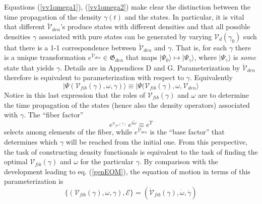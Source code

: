 \documentclass[aps,preprint]{revtex4}%
\begin{document}
Equations (\ref{vv1omega1}), (\ref{vv1omega2}) make clear the distinction
between the time propagation of the density $\gamma(t)$ and the states. In
particular, it is vital that different $\breve{\mathcal{V}}_{den}$'s produce
states with different densities and that all possible densities $\gamma$
associated with pure states can be generated by varying $\mathcal{V}%
_{d}(\gamma_{0})$ such that there is a 1-1 correspondence between
$\breve{\mathcal{V}}_{den}$ and $\gamma$. That is, for each $\gamma$ there is
a unique transformation $e^{\breve{\mathcal{V}}_{den}}\in\mathfrak{G}_{den}$
that maps $|\Psi_{0}\rangle\mapsto|\Psi_{\gamma}\rangle$, where $|\Psi
_{\gamma}\rangle$ is \emph{some} state that yields $\gamma$. Details are in
Appendices D and G. Parameterization by $\breve{\mathcal{V}}_{den}$ therefore
is equivalent to parameterization with respect to $\gamma$. Equivalently
\begin{equation}
|\Psi(\mathcal{V}_{fib}(\gamma),\omega,\gamma)\rangle\equiv|\Psi
(\mathcal{V}_{fib}(\gamma),\omega,\mathcal{V}_{den}\rangle
\end{equation}
Notice in this last expression that the roles of $\mathcal{V}_{fib}(\gamma)$
and $\omega$ are to determine the time propagation of the states (hence also
the density operators) associated with $\gamma$. The ``fiber factor''
\begin{equation}
e^{_{\mathcal{\breve{V}}_{fib}(\gamma)}}\,e^{i\breve{\omega}}\equiv
e^{\breve{\Upsilon}} \label{fiberfactor}%
\end{equation}
selects among elements of the fiber, while $e^{\breve{\mathcal{V}}_{den}}$ is
the ``base factor'' that determines which $\gamma$ will be reached from the
initial one. From this perspective, the task of constructing density
functionals is equivalent to the task of finding the optimal $\mathcal{V}%
_{fib}(\gamma)$ and $\omega$ for the particular $\gamma$. By comparison with
the development leading to eq. (\ref{genEOM}), the equation of motion in terms
of this parameterization is
\begin{equation}
\{(\mathcal{V}_{fib}(\gamma),\omega,\gamma),\mathcal{E}\}=(\mathcal{\dot{V}%
}_{fib}(\gamma),\dot{\omega},\dot{\gamma}) \label{Vomegagammaeom}%
\end{equation}
\end{document}

